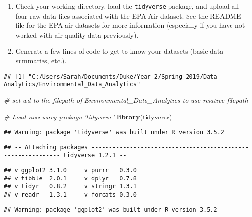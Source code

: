 \documentclass[]{article}
\newenvironment{Shaded}{\begin{snugshade}}{\end{snugshade}}
\newcommand{\KeywordTok}[1]{\textcolor[rgb]{0.13,0.29,0.53}{\textbf{#1}}}
\newcommand{\CommentTok}[1]{\textcolor[rgb]{0.56,0.35,0.01}{\textit{#1}}}
\newcommand{\NormalTok}[1]{#1}
\begin{document}
\begin{enumerate}
\def\labelenumi{\arabic{enumi}.}
\item
  Check your working directory, load the \texttt{tidyverse} package, and
  upload all four raw data files associated with the EPA Air dataset.
  See the README file for the EPA air datasets for more information
  (especially if you have not worked with air quality data previously).
\item
  Generate a few lines of code to get to know your datasets (basic data
  summaries, etc.).
\end{enumerate}

\begin{Shaded}
\end{Shaded}

\begin{verbatim}
## [1] "C:/Users/Sarah/Documents/Duke/Year 2/Spring 2019/Data Analytics/Environmental_Data_Analytics"
\end{verbatim}

\begin{Shaded}
\begin{Highlighting}[]
\CommentTok{# set wd to the filepath of Environmental_Data_Analytics to use relative filepath}

\CommentTok{# Load necessary package 'tidyverse'}
\KeywordTok{library}\NormalTok{(tidyverse)}
\end{Highlighting}
\end{Shaded}

\begin{verbatim}
## Warning: package 'tidyverse' was built under R version 3.5.2
\end{verbatim}

\begin{verbatim}
## -- Attaching packages ------------------------------------------------------------- tidyverse 1.2.1 --
\end{verbatim}

\begin{verbatim}
## v ggplot2 3.1.0     v purrr   0.3.0
## v tibble  2.0.1     v dplyr   0.7.8
## v tidyr   0.8.2     v stringr 1.3.1
## v readr   1.3.1     v forcats 0.3.0
\end{verbatim}

\begin{verbatim}
## Warning: package 'ggplot2' was built under R version 3.5.2
\end{verbatim}
\end{document}
